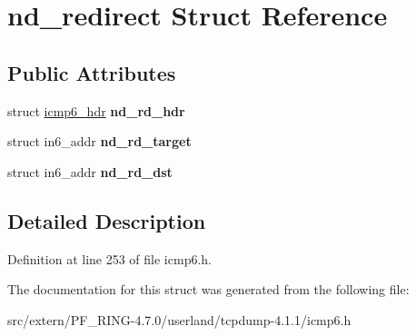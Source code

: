 \hypertarget{structnd__redirect}{
\section{nd\_\-redirect Struct Reference}
\label{structnd__redirect}
}
\subsection*{Public Attributes}
\begin{DoxyCompactItemize}
\item 
\hypertarget{structnd__redirect_a53ff1a170a4276718878d3b077033f01}{
struct \hyperlink{structicmp6__hdr}{icmp6\_\-hdr} {\bfseries nd\_\-rd\_\-hdr}}
\label{structnd__redirect_a53ff1a170a4276718878d3b077033f01}

\item 
\hypertarget{structnd__redirect_ae4d06b44b65b9af7bd44a9591a195f02}{
struct in6\_\-addr {\bfseries nd\_\-rd\_\-target}}
\label{structnd__redirect_ae4d06b44b65b9af7bd44a9591a195f02}

\item 
\hypertarget{structnd__redirect_a0633cf630a1c46440c25e3619296af3b}{
struct in6\_\-addr {\bfseries nd\_\-rd\_\-dst}}
\label{structnd__redirect_a0633cf630a1c46440c25e3619296af3b}

\end{DoxyCompactItemize}


\subsection{Detailed Description}


Definition at line 253 of file icmp6.h.



The documentation for this struct was generated from the following file:\begin{DoxyCompactItemize}
\item 
src/extern/PF\_\-RING-\/4.7.0/userland/tcpdump-\/4.1.1/icmp6.h\end{DoxyCompactItemize}

